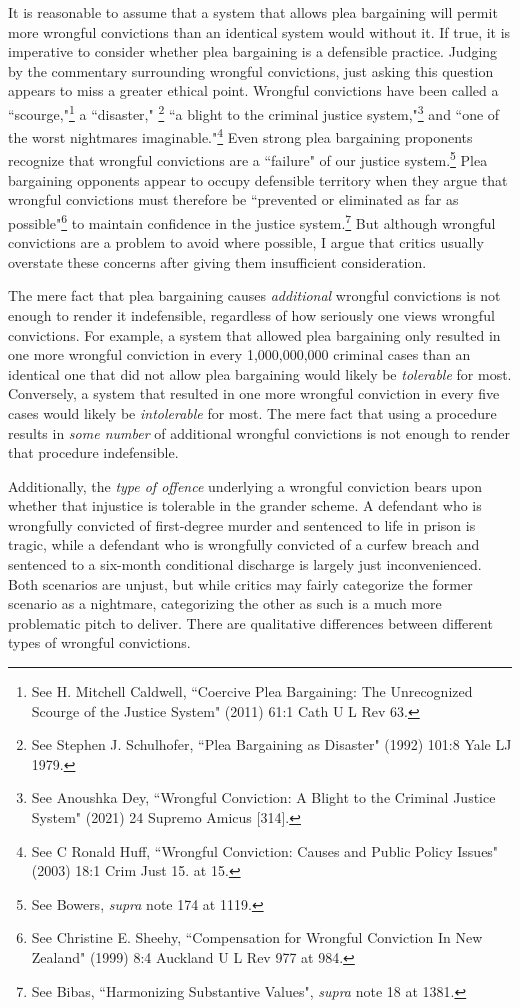 It is reasonable to assume that a system that allows plea bargaining will permit more wrongful convictions than an identical system would without it. If true, it is imperative to consider whether plea bargaining is a defensible practice. Judging by the commentary surrounding wrongful convictions, just asking this question appears to miss a greater ethical point. Wrongful convictions have been called a ``scourge,"\footnote{See H. Mitchell Caldwell, ``Coercive Plea Bargaining: The Unrecognized Scourge of the Justice System" (2011) 61:1 Cath U L Rev 63.} a ``disaster," \footnote{See Stephen J. Schulhofer, ``Plea Bargaining as Disaster" (1992) 101:8 Yale LJ 1979.} ``a blight to the criminal justice system,"\footnote{See Anoushka Dey, ``Wrongful Conviction: A Blight to the Criminal Justice System" (2021)
24 Supremo Amicus [314].} and ``one of the worst nightmares imaginable."\footnote{See C Ronald Huff, ``Wrongful Conviction: Causes and Public Policy Issues" (2003) 18:1 Crim Just 15. at 15.} Even strong plea bargaining proponents recognize that wrongful convictions are a ``failure" of our justice system.\footnote{See Bowers, \textit{supra} note 174 at 1119.} Plea bargaining opponents appear to occupy defensible territory when they argue that wrongful convictions must therefore be ``prevented or eliminated as far as possible"\footnote{See Christine E. Sheehy, ``Compensation for Wrongful Conviction In New Zealand" (1999) 8:4 Auckland U L Rev 977 at 984.} to maintain confidence in the justice system.\footnote{See Bibas, ``Harmonizing Substantive Values", \textit{supra} note 18 at 1381.} But although wrongful convictions are a problem to avoid where possible, I argue that critics usually overstate these concerns after giving them insufficient consideration.

The mere fact that plea bargaining causes \textit{additional} wrongful convictions is not enough to render it indefensible, regardless of how seriously one views wrongful convictions. For example, a system that allowed plea bargaining only resulted in one more wrongful conviction in every 1,000,000,000 criminal cases than an identical one that did not allow plea bargaining would likely be \textit{tolerable} for most. Conversely, a system that resulted in one more wrongful conviction in every five cases would likely be \textit{intolerable} for most. The mere fact that using a procedure results in \textit{some number} of additional wrongful convictions is not enough to render that procedure indefensible. 

Additionally, the \textit{type of offence} underlying a wrongful conviction bears upon whether that injustice is tolerable in the grander scheme. A defendant who is wrongfully convicted of first-degree murder and sentenced to life in prison is tragic, while a defendant who is wrongfully convicted of a curfew breach and sentenced to a six-month conditional discharge is largely just inconvenienced. Both scenarios are unjust, but while critics may fairly categorize the former scenario as a nightmare, categorizing the other as such is a much more problematic pitch to deliver. There are qualitative differences between different types of wrongful convictions.

